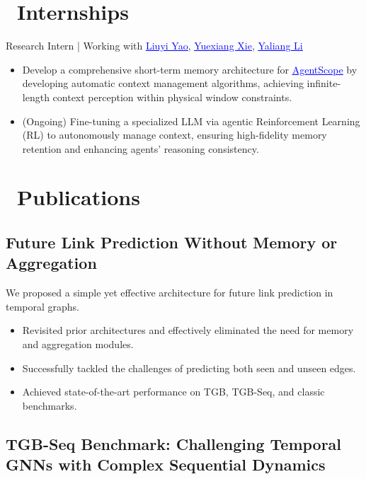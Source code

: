 \documentclass{resume}
\begin{document}
\section{\faCogs\ Internships}
Research Intern | Working with \href{https://osier-yi.github.io/}{\textcolor{blue}{\underline{Liuyi Yao}}}, \href{https://xieyxclack.github.io/}{\textcolor{blue}{\underline{Yuexiang Xie}}}, \href{https://sites.google.com/site/yaliangli/}{\textcolor{blue}{\underline{Yaliang Li}}}
\begin{itemize}
  \item Develop a comprehensive short-term memory architecture for \href{https://arxiv.org/abs/2402.14034}{\textcolor{blue}{\underline{AgentScope}}} by developing automatic context management algorithms, achieving infinite-length context perception within physical window constraints.
  \item (Ongoing) Fine-tuning a specialized LLM via agentic Reinforcement Learning (RL) to autonomously manage context, ensuring high-fidelity memory retention and enhancing agents' reasoning consistency.
\end{itemize}

\section{\faLeanpub\ Publications}
\subsection{\bf Future Link Prediction Without Memory or Aggregation} 

We proposed a simple yet effective architecture for future link prediction in temporal graphs.
\begin{itemize}
  \item Revisited prior architectures and effectively eliminated the need for memory and aggregation modules.
  \item Successfully tackled the challenges of predicting both seen and unseen edges.
  \item Achieved state-of-the-art performance on TGB, TGB-Seq, and classic benchmarks.
\end{itemize}

\subsection{\bf TGB-Seq Benchmark: Challenging Temporal GNNs with Complex Sequential Dynamics} 
\end{document}
